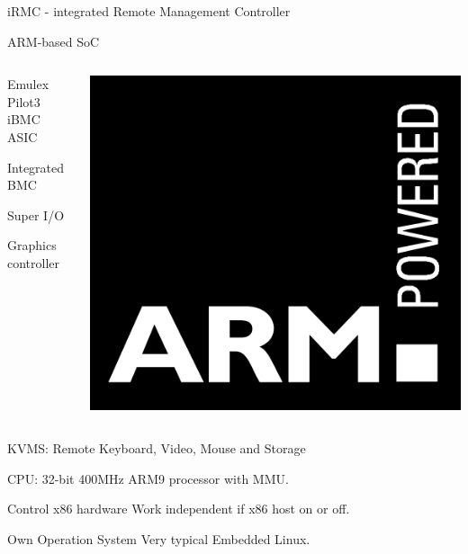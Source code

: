 \documentclass{beamer}
\begin{document}
  \begin{frame}{iRMC - integrated Remote Management Controller}
	  \begin{block}{ARM-based SoC}
		  \begin{columns}[onlytextwidth]
			  \begin{column}{0.7\textwidth}

				  Emulex Pilot3 iBMC ASIC

				  Integrated BMC 

				  Super I/O

				  Graphics controller


			  \end{column}
			  \begin{column}{0.2\textwidth}
				  \includegraphics[width=\textwidth]{logo/ARM_powered.png}
			  \end{column}
		  \end{columns}

		  KVMS: Remote Keyboard, Video, Mouse and Storage

		  CPU: 32-bit 400MHz ARM9 processor with MMU.
	  \end{block}
	  \pause

	  \begin{block}{Control x86 hardware}
		  Work independent if x86 host on or off.
	  \end{block}
	  \pause

	  \begin{block}{Own Operation System}
		  Very typical Embedded Linux.
	  \end{block}
	  
  \end{frame}
\end{document}
